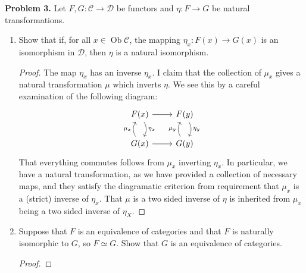 \documentclass[reqno]{amsart}
\DeclareMathOperator{\Ob}{Ob}
\theoremstyle{definition}
\theoremstyle{remark}
\newcommand{\prob}[1] {
  \textbf{Problem #1.}
}
\begin{document}
\prob{3} Let $F, G : \mathcal{C} \to \mathcal{D}$ be functors and $\eta : F \to
G$ be natural transformations.

\begin{enumerate}
  \item Show that if, for all $x \in \Ob \mathcal{C}$, the mapping $\eta_x :
    F(x) \to G(x)$ is an isomorphism in $\mathcal{D}$, then $\eta$ is a natural
    isomorphism.

    \begin{proof}
      The map $\eta_x$ has an inverse $\eta_x$. I claim that the collection of
      $\mu_x$ gives a natural transformation $\mu$ which inverts $\eta$. We
      see this by a careful examination of the following diagram:
      \[
        \begin{tikzcd}
          F(x) \ar[r] \ar[d, bend left, "\eta_x"] & F(y) \ar[d, bend left,
          "\eta_y"] \\
          G(x) \ar[r] \ar[u, bend left, "\mu_x"] & G(y) \ar[u, bend left,
          "\mu_y"]
        \end{tikzcd}
      \]
      That everything commutes follows from $\mu_x$ inverting $\eta_x$. In
      particular, we have a natural transformation, as we have provided a
      collection of necessary maps, and they satisfy the diagramatic criterion
      from requirement that $\mu_x$ is a (strict) inverse of $\eta_x$. That
      $\mu$ is a two sided inverse of $\eta$ is inherited from $\mu_x$ being a two
      sided inverse of $\eta_X$.
    \end{proof}

  \item Suppose that $F$ is an equivalence of categories and that $F$ is
    naturally isomorphic to $G$, so $F \simeq G$. Show that $G$ is an
    equivalence of categories.

    \begin{proof}
      
    \end{proof}
\end{enumerate}
\end{document}
